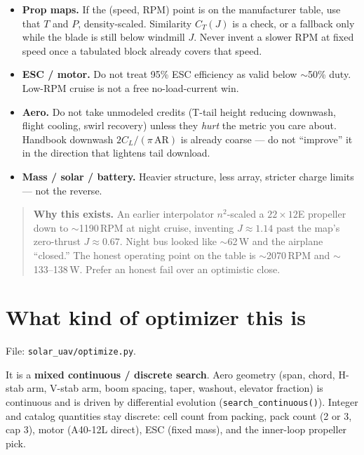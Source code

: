 \documentclass[11pt,letterpaper]{article}
\newcommand{\code}[1]{\texttt{#1}}
\newenvironment{warningbox}{\begin{quote}\small}{\end{quote}}
\begin{document}
\begin{itemize}
  \item \textbf{Prop maps.} If the (speed, RPM) point is on the manufacturer table, use that $T$ and $P$, density-scaled. Similarity $C_T(J)$ is a check, or a fallback only while the blade is still below windmill $J$. Never invent a slower RPM at fixed speed once a tabulated block already covers that speed.
  \item \textbf{ESC / motor.} Do not treat 95\% ESC efficiency as valid below $\sim$50\% duty. Low-RPM cruise is not a free no-load-current win.
  \item \textbf{Aero.} Do not take unmodeled credits (T-tail height reducing downwash, flight cooling, swirl recovery) unless they \emph{hurt} the metric you care about. Handbook downwash $2C_L/(\pi\,\mathrm{AR})$ is already coarse --- do not ``improve'' it in the direction that lightens tail download.
  \item \textbf{Mass / solar / battery.} Heavier structure, less array, stricter charge limits --- not the reverse.
\end{itemize}

\begin{warningbox}
\textbf{Why this exists.} An earlier interpolator $n^2$-scaled a $22\times12$E propeller down to $\sim$1190\,RPM at night cruise, inventing $J \approx 1.14$ past the map's zero-thrust $J \approx 0.67$. Night bus looked like $\sim$62\,W and the airplane ``closed.'' The honest operating point on the table is $\sim$2070\,RPM and $\sim$133--138\,W. Prefer an honest fail over an optimistic close.
\end{warningbox}

\section{What kind of optimizer this is}

File: \code{solar\_uav/optimize.py}.

It is a \textbf{mixed continuous / discrete search}. Aero geometry (span, chord, H-stab arm, V-stab arm, boom spacing, taper, washout, elevator fraction) is continuous and is driven by differential evolution (\code{search\_continuous()}). Integer and catalog quantities stay discrete: cell count from packing, pack count (2 or 3, cap 3), motor (A40-12L direct), ESC (fixed mass), and the inner-loop propeller pick.
\end{document}
